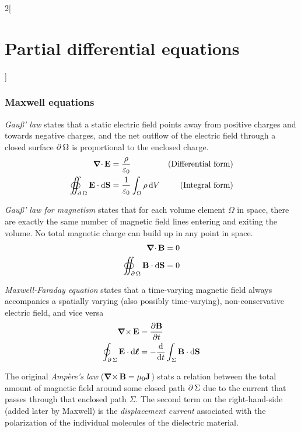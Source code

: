 \documentclass[../../../main_math.tex]{subfiles}
\begin{document}
\begin{multicols}{2}[\section{Partial differential equations}]
  \subsubsection{Maxwell equations}
  \begin{proposition}
    \emph{Gau\ss' law} states that a static electric field points away from positive charges and towards negative charges, and the net outflow of the electric field through a closed surface $\operatorname{\partial}{\Omega}$ is proportional to the enclosed charge.
    \begin{align*}
      \operatorname{\boldsymbol{\mathrm{\nabla}}\cdot}\boldsymbol{\mathrm{E}}                                 & =\frac{\rho}{\varepsilon_0}                   & \text{(Differential form)} \\
      \oiint_{\operatorname{\partial}{\Omega}}\boldsymbol{\mathrm{E}}\cdot \dd{\boldsymbol{\mathrm{S}}} & =\frac{1}{\varepsilon_0}\int_\Omega\rho\dd{V} & \text{(Integral form)}
    \end{align*}
  \end{proposition}
  \begin{proposition}
    \emph{Gau\ss' law for magnetism} states that for each volume element $\Omega$ in space, there are exactly the same number of magnetic field lines entering and exiting the volume. No total magnetic charge can build up in any point in space.
    \begin{align*}
      \operatorname{\boldsymbol{\mathrm{\nabla}}\cdot}\boldsymbol{\mathrm{B}}                                 & =0 \\
      \oiint_{\operatorname{\partial}{\Omega}}\boldsymbol{\mathrm{B}}\cdot \dd{\boldsymbol{\mathrm{S}}} & =0
    \end{align*}
  \end{proposition}
  \begin{proposition}
    \emph{Maxwell-Faraday equation} states that a time-varying magnetic field always accompanies a spatially varying (also possibly time-varying), non-conservative electric field, and vice versa
    \begin{align*}
      \operatorname{\boldsymbol{\mathrm{\nabla}}\times}\boldsymbol{\mathrm{E}}                                   & =\pdv{\boldsymbol{\mathrm{B}}}{t}                             \\
      \oint_{\operatorname{\partial}{\Sigma}}\boldsymbol{\mathrm{E}}\cdot \dd{\boldsymbol{\mathrm{\ell}}} & =-\dv{}{t}\int_\Sigma\boldsymbol{\mathrm{B}}\cdot \dd{\boldsymbol{\mathrm{S}}}
    \end{align*}
  \end{proposition}
  \begin{proposition}
    The original \emph{Ampère's law} ($\operatorname{\boldsymbol{\mathrm{\nabla}}\times}\boldsymbol{\mathrm{B}}=\mu_0\boldsymbol{\mathrm{J}}$) stats a relation between the total amount of magnetic field around some closed path $\operatorname{\partial}{\Sigma}$ due to the current that passes through that enclosed path $\Sigma$. The second term on the right-hand-side (added later by Maxwell) is the \emph{displacement current} associated with the polarization of the individual molecules of the dielectric material.

\end{proposition}
\end{multicols}
\end{document}
